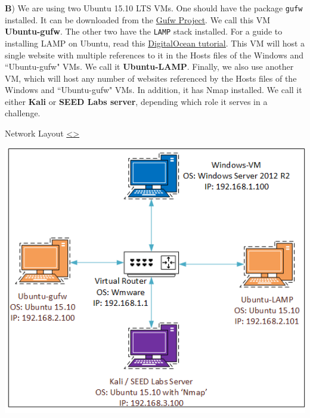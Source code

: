 \documentclass[12pt]{extarticle}
\newenvironment{instructionblock}{\Large\bgroup}{\egroup}
\begin{document}
\vspace{4mm}
\noindent
\label{UbuntuSetup}
\textbf{B}) We are using two Ubuntu 15.10 LTS VMs. One should have the package \texttt{gufw} installed. It can be downloaded from the \href{http://gufw.org/}{Gufw Project}. We call this VM \textbf{Ubuntu-gufw}. The other two have the \texttt{LAMP} stack installed. For a guide to installing LAMP on Ubuntu, read this  \href{https://www.digitalocean.com/community/tutorials/how-to-install-linux-apache-mysql-php-lamp-stack-on-ubuntu-16-04}{DigitalOcean {\underline{tutorial}}}. This VM will host a single website with multiple references to it in the Hosts files of the Windows and ``Ubuntu-gufw" VMs. We call it \textbf{Ubuntu-LAMP}. Finally, we also use another VM, which will host any number of websites referenced by the Hosts files of the Windows and ``Ubuntu-gufw" VMs. In addition, it has Nmap installed. We call it either \textbf{Kali} or \textbf{SEED Labs server}, depending which role it serves in a challenge.










\pagebreak
\begin{slide}{ Network Layout }{ \hyperref[slide 3]{\textless}\hyperref[slide 5]{\textgreater} }
\vskip 5pt
	\begin{instructionblock}
		\begin{center}
			\includegraphics{NetworkDiagram.png}
		\end{center}
	\end{instructionblock}
\end{slide}
\end{document}
